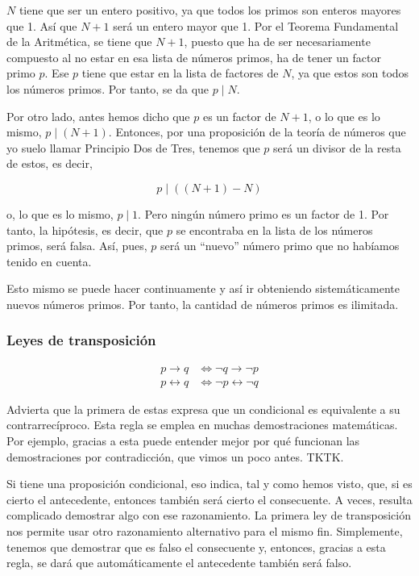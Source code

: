 $N$ tiene que ser un entero positivo, ya que todos los primos son enteros
mayores que 1. Así que $N+1$ será un entero mayor que 1. Por el Teorema
Fundamental de la Aritmética, se tiene que $N+1$, puesto que ha de ser
necesariamente compuesto al no estar en esa lista de números primos, ha de
tener un factor primo $p$. Ese $p$ tiene que estar en la lista de factores
de $N$, ya que estos son todos los números primos. Por tanto, se da que $p
\mid N$.

Por otro lado, antes hemos dicho que $p$ es un factor de $N+1$, o lo que es
lo mismo, $p \mid (N+1)$. Entonces, por una proposición de la teoría de
números que yo suelo llamar Principio Dos de Tres, tenemos que $p$ será un
divisor de la resta de estos, es decir,

$$ p \mid ((N+1) - N) $$

\noindent o, lo que es lo mismo, $p \mid 1$. Pero ningún número primo es un
factor de 1. Por tanto, la hipótesis, es decir, que $p$ se encontraba en la
lista de los números primos, será falsa. Así, pues, $p$ será un ``nuevo''
número primo que no habíamos tenido en cuenta.

Esto mismo se puede hacer continuamente y así ir obteniendo sistemáticamente
nuevos números primos. Por tanto, la cantidad de números primos es
ilimitada.





\subsubsection{Leyes de transposición}

\begin{align*}
  p \to q &\iff \neg q \to \neg p \\
  p \leftrightarrow q &\iff \neg p \leftrightarrow \neg q
\end{align*}

Advierta que la primera de estas expresa que un condicional es equivalente a
su contrarrecíproco. Esta regla se emplea en muchas demostraciones
matemáticas. Por ejemplo, gracias a esta puede entender mejor por qué
funcionan las demostraciones por contradicción, que vimos un poco antes.
TKTK.

Si tiene una proposición condicional, eso indica, tal y como hemos visto,
que, si es cierto el antecedente, entonces también será cierto el
consecuente. A veces, resulta complicado demostrar algo con ese
razonamiento. La primera ley de transposición nos permite usar otro
razonamiento alternativo para el mismo fin. Simplemente, tenemos que
demostrar que es falso el consecuente y, entonces, gracias a esta regla, se
dará que automáticamente el antecedente también será falso.

